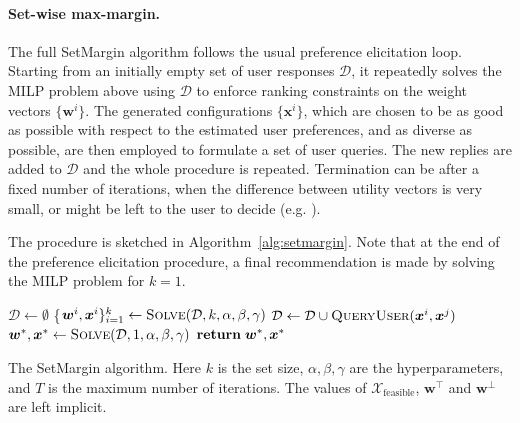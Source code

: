 \documentclass{article}
\renewcommand\[{\begin{equation}}
\renewcommand\]{\end{equation}}
\newcommand{\calvar}[1]{\ensuremath{\mathcal{#1}}}
\newcommand{\calD}{\calvar{D}}
\newcommand{\calX}{\calvar{X}}
\newcommand{\vecvar}[1]{\ensuremath{\boldsymbol{#1}}}
\newcommand{\vw}{\vecvar{w}}
\newcommand{\vx}{\vecvar{x}}
\begin{document}
\paragraph{Set-wise max-margin.} The full {\sc SetMargin} algorithm
follows the usual preference elicitation loop. Starting from an
initially empty set of user responses $\calD$, it repeatedly solves
the MILP problem above using $\calD$ to enforce ranking
constraints on the weight vectors $\{\vw^i\}$. The generated
configurations $\{\vx^i\}$, which are chosen to be as good as possible
with respect to the estimated user preferences, and as diverse as
possible, are then employed to formulate a set of user queries. The
new replies are added to $\calD$ and the whole procedure is
repeated. Termination can be after a fixed number of iterations,
when the difference between utility vectors is very small, or might be left
to the user to decide (e.g. \cite{Reilly2007}).

The procedure is sketched in
Algorithm~\ref{alg:setmargin}. Note that at the end of the preference
elicitation procedure, a final recommendation is made by solving the
MILP problem for $k=1$.

\begin{algorithm}[t]
{\footnotesize
\begin{algorithmic}[1]
        \State $\calD \gets \emptyset$
            \State \{$\vw^{i}, \vx^{i}\}_{i=1}^k \gets \text{{\sc Solve}}(\calD, k, \alpha, \beta, \gamma)$
            \For{$\vx^{i},\vx^{j} \in \{ \vx^{1}, \ldots, \vx^{k} \} \; \text{{\bf s.t.}} \; i < j$}
                \State $\calD \gets \calD \cup \text{{\sc QueryUser}}(\vx^{i},\vx^{j})$
            \EndFor
        \EndFor
        \State $\vw^*, \vx^* \gets \text{{\sc Solve}}(\calD, 1, \alpha, \beta, \gamma)$
        \State ${\bf return}\; \vw^*, \vx^*$
    \EndProcedure
\end{algorithmic}
}
\caption{\label{alg:setmargin} The {\sc SetMargin} algorithm. Here $k$ is the
set size, $\alpha,\beta,\gamma$ are the hyperparameters, and $T$ is the maximum
number of iterations. The values of $\calX_\text{feasible}$, $\vw^\top$ and
$\vw^\bot$ are left implicit.}
\end{algorithm}
\end{document}
